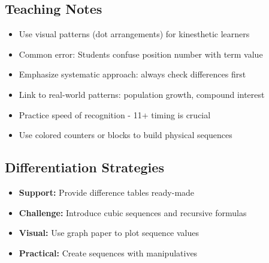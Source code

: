 \documentclass{article}
\begin{document}
\subsection*{Teaching Notes}
\begin{itemize}
    \item Use visual patterns (dot arrangements) for kinesthetic learners
    \item Common error: Students confuse position number with term value
    \item Emphasize systematic approach: always check differences first
    \item Link to real-world patterns: population growth, compound interest
    \item Practice speed of recognition - 11+ timing is crucial
    \item Use colored counters or blocks to build physical sequences
\end{itemize}

\subsection*{Differentiation Strategies}
\begin{itemize}
    \item \textbf{Support:} Provide difference tables ready-made
    \item \textbf{Challenge:} Introduce cubic sequences and recursive formulas  
    \item \textbf{Visual:} Use graph paper to plot sequence values
    \item \textbf{Practical:} Create sequences with manipulatives
\end{itemize}
\end{document}
